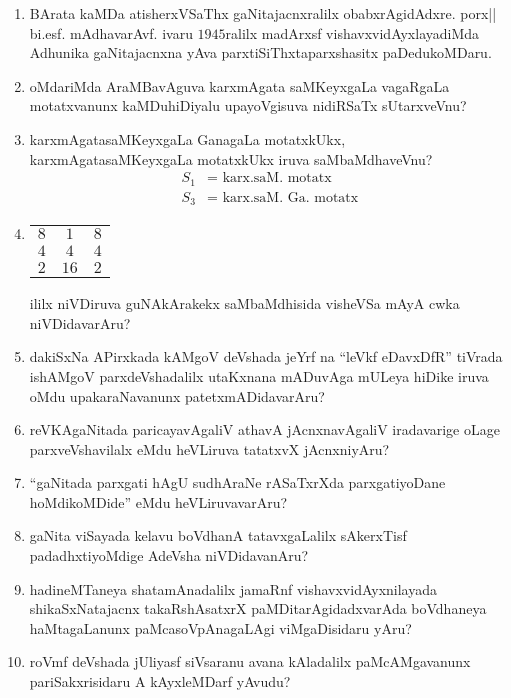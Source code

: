 \begin{enumerate}
\item BArata kaMDa atisherxVSaThx gaNitajacnxralilx obabxrAgidAdxre. porx|| bi.esf. mAdhavarAvf. ivaru $1945$ralilx madArxsf vishavxvidAyxlayadiMda Adhunika gaNitajacnxna yAva parxtiSiThxtaparxshasitx paDedukoMDaru.
  
\item oMdariMda AraMBavAguva karxmAgata saMKeyxgaLa vagaRgaLa motatxvanunx kaMDuhiDiyalu upayoVgisuva nidiRSaTx sUtarxveVnu?

  \newpage
  
\item karxmAgatasaMKeyxgaLa GanagaLa motatxkUkx, karxmAgatasaMKeyxgaLa motatxkUkx iruva saMbaMdhaveVnu?
  \begin{align*}
    S_1 & = \text{ karx.saM. motatx}\\
    S_3 & = \text{ karx.saM. Ga. motatx}
  \end{align*}
  
\item
    \begin{tabular}[t]{ccc}
    $8$&$1$&$8$\\
    $4$&$4$&$4$\\
    $2$&$16$&$2$
  \end{tabular}

  ililx niVDiruva guNAkArakekx saMbaMdhisida visheVSa mAyA cwka niVDidavarAru?
  
\item dakiSxNa APirxkada kAMgoV deVshada jeYrf na ``leVkf eDavxDfR'' tiVrada ishAMgoV parxdeVshadalilx utaKxnana mADuvAga mULeya hiDike iruva oMdu upakaraNavanunx patetxmADidavarAru?

\item reVKAgaNitada paricayavAgaliV athavA jAcnxnavAgaliV iradavarige oLage parxveVshavilalx eMdu heVLiruva tatatxvX jAcnxniyAru?

\item ``gaNitada parxgati hAgU sudhAraNe rASaTxrXda parxgatiyoDane hoMdikoMDide'' eMdu heVLiruvavarAru?

\item gaNita viSayada kelavu boVdhanA tatavxgaLalilx sAkerxTisf padadhxtiyoMdige AdeVsha niVDidavanAru?

\item hadineMTaneya shatamAnadalilx jamaRnf vishavxvidAyxnilayada shikaSxNatajacnx takaRshAsatxrX paMDitarAgidadxvarAda boVdhaneya haMtagaLanunx paMcasoVpAnagaLAgi viMgaDisidaru yAru?

\item roVmf deVshada jUliyasf siVsaranu avana kAladalilx paMcAMgavanunx pariSakxrisidaru A kAyxleMDarf yAvudu?


\end{enumerate}

